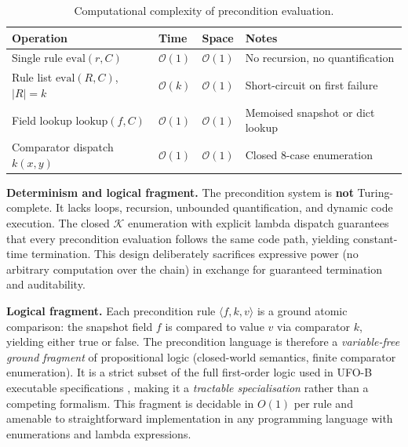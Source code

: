 \begin{table}[htbp]
\centering
\caption{Computational complexity of precondition evaluation.}
\label{tab:complexity-full}
\begin{tabular}{@{}llll@{}}
\toprule
\textbf{Operation} & \textbf{Time} & \textbf{Space} & \textbf{Notes} \\
\midrule
Single rule $\text{eval}(r, C)$ & $\mathcal{O}(1)$ & $\mathcal{O}(1)$ & No recursion, no quantification \\
Rule list $\text{eval}(R, C)$, $|R| = k$ & $\mathcal{O}(k)$ & $\mathcal{O}(1)$ & Short-circuit on first failure \\
Field lookup $\text{lookup}(f, C)$ & $\mathcal{O}(1)$ & $\mathcal{O}(1)$ & Memoised snapshot or dict lookup \\
Comparator dispatch $k(x, y)$ & $\mathcal{O}(1)$ & $\mathcal{O}(1)$ & Closed 8-case enumeration \\
\bottomrule
\end{tabular}
\end{table}

\textbf{Determinism and logical fragment.} The precondition system is \textbf{not} Turing-complete. It lacks loops, recursion, unbounded quantification, and dynamic code execution. The closed $\mathcal{K}$ enumeration with explicit lambda dispatch guarantees that every precondition evaluation follows the same code path, yielding constant-time termination. This design deliberately sacrifices expressive power (no arbitrary computation over the chain) in exchange for guaranteed termination and auditability.

\textbf{Logical fragment.} Each precondition rule $\langle f, k, v \rangle$ is a ground atomic comparison: the snapshot field $f$ is compared to value $v$ via comparator $k$, yielding either true or false. The precondition language is therefore a \emph{variable-free ground fragment} of propositional logic (closed-world semantics, finite comparator enumeration). It is a strict subset of the full first-order logic used in UFO-B executable specifications \cite{guizzardi2024ufob}, making it a \emph{tractable specialisation} rather than a competing formalism. This fragment is decidable in $O(1)$ per rule and amenable to straightforward implementation in any programming language with enumerations and lambda expressions.

